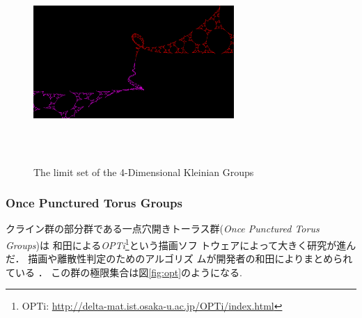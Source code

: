 \begin{figure}[h!tbp]
\begin{minipage}{0.49\hsize}
  \subcaption{}
 \end{minipage}
 \hspace*{\fill}
 \begin{minipage}{0.49\hsize}
  \center
  \includegraphics[width=3in, height=3in, keepaspectratio]{../img/klein/sakugawa4.pdf}
  \subcaption{}
 \end{minipage}
 \caption{The limit set of the 4-Dimensional Kleinian Groups}
 \label{fig:sakugawa}
\end{figure}

\subsubsection{Once Punctured Torus Groups}

クライン群の部分群である一点穴開きトーラス群({\it Once Punctured Torus Groups})は
和田による{\it OPTi}\footnote{OPTi:
\url{http://delta-mat.ist.osaka-u.ac.jp/OPTi/index.html}}という描画ソフ
トウェアによって大きく研究が進んだ．
描画や離散性判定のためのアルゴリズ
ムが開発者の和田によりまとめられている
\cite{OPTiDrawing}\cite{OPTiDiscrete}．
この群の極限集合は図\ref{fig:opt}のようになる.

